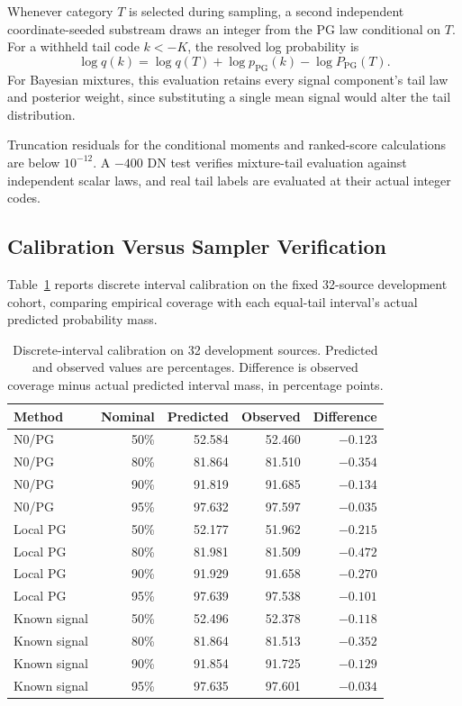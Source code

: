 \documentclass[10pt,twocolumn,journal]{IEEEtran}
\begin{document}
Whenever category $T$ is selected during sampling, a second independent coordinate-seeded substream draws an integer from the PG law conditional on $T$. For a withheld tail code $k<-K$, the resolved log probability is
\begin{equation}
\log q(k)=\log q(T)+\log p_{\mathrm{PG}}(k)-\log P_{\mathrm{PG}}(T).
\end{equation}
For Bayesian mixtures, this evaluation retains every signal component's tail law and posterior weight, since substituting a single mean signal would alter the tail distribution.

Truncation residuals for the conditional moments and ranked-score calculations are below $10^{-12}$. A $-400$ DN test verifies mixture-tail evaluation against independent scalar laws, and real tail labels are evaluated at their actual integer codes.

\subsection{Calibration Versus Sampler Verification}
Table~\ref{tab:coverage} reports discrete interval calibration on the fixed 32-source development cohort, comparing empirical coverage with each equal-tail interval's actual predicted probability mass.

\begin{table}[t]
\centering
\caption{Discrete-interval calibration on 32 development sources. Predicted and observed values are percentages. Difference is observed coverage minus actual predicted interval mass, in percentage points.}
\label{tab:coverage}
\footnotesize
\setlength{\tabcolsep}{3pt}
\begin{tabular}{@{}lrrrr@{}}
\toprule
Method & Nominal & Predicted & Observed & Difference\\
\midrule
N0/PG & 50\% & 52.584 & 52.460 & $-0.123$\\
N0/PG & 80\% & 81.864 & 81.510 & $-0.354$\\
N0/PG & 90\% & 91.819 & 91.685 & $-0.134$\\
N0/PG & 95\% & 97.632 & 97.597 & $-0.035$\\
Local PG & 50\% & 52.177 & 51.962 & $-0.215$\\
Local PG & 80\% & 81.981 & 81.509 & $-0.472$\\
Local PG & 90\% & 91.929 & 91.658 & $-0.270$\\
Local PG & 95\% & 97.639 & 97.538 & $-0.101$\\
Known signal & 50\% & 52.496 & 52.378 & $-0.118$\\
Known signal & 80\% & 81.864 & 81.513 & $-0.352$\\
Known signal & 90\% & 91.854 & 91.725 & $-0.129$\\
Known signal & 95\% & 97.635 & 97.601 & $-0.034$\\
\bottomrule
\end{tabular}
\end{table}
\end{document}
